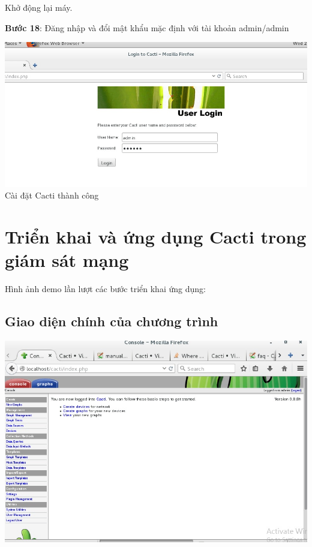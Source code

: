 \documentclass[12pt,oneside,a4paper,reqno]{report}
\begin{document}
\begin{large}
Khở động lại máy.

\textbf{Bước 18}: Đăng nhập và đổi mật khẩu mặc định với tài khoản admin/admin


\begin{center}
	\includegraphics[scale=0.6]{images/cacti-login.jpg}\\
	Cài đặt Cacti thành công
\end{center}

\section{Triển khai và ứng dụng Cacti trong giám sát mạng}
Hình ảnh demo lần lượt các bước triển khai ứng dụng:
\subsection{Giao diện chính của chương trình}
\begin{center}

	\includegraphics[scale=0.6]{images/cacti-main.jpg}\\
\end{center}



\end{large}
\end{document}
